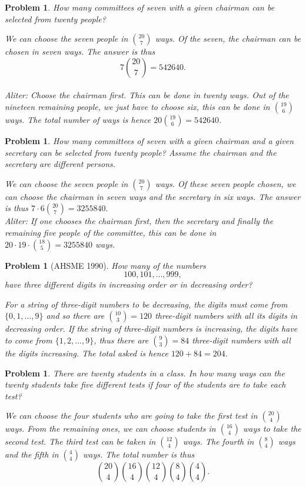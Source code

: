 \documentclass[11pt, openany]{book}
\theoremstyle{change} \theoremheaderfont{\blue\sffamily\bfseries}
\newtheorem{pro}[thm]{Problem}
\theoremstyle{nonumberplain} \theoremheaderfont{\sffamily\bfseries}
\def\binom#1#2{{#1\choose#2}}
\newcommand{\í}{\'{\i}}
\begin{document}
\begin{multicols}{2}
\begin{pro} How many committees of seven with a given chairman can be
selected from twenty people? \begin{answer} We can choose the seven
people in $\binom{20}{7}$ ways. Of the seven, the chairman
can be chosen in seven ways. The answer is thus $$7\binom{20}{7} = 542640.$$ \\
{\em Aliter}: Choose the chairman first. This can be done in twenty
ways. Out of the nineteen remaining people, we just have to choose
six, this can be done in $\binom{19}{6}$ ways. The total number of
ways is hence $20\binom{19}{6} = 542640$.
\end{answer}
\end{pro}
\begin{pro} How many committees of seven with a given chairman and a given
secretary can be selected from twenty people? Assume the chairman
and the secretary are different persons. \begin{answer} We can
choose the seven people in $\binom{20}{7}$ ways. Of these seven
people chosen, we can choose the chairman in seven ways and the
secretary in six ways. The
answer is thus $7\cdot 6\binom{20}{7} = 3255840.$ \\
{\em Aliter}: If one chooses the chairman first, then the secretary
and finally the remaining five people of the committee, this can be
done in $20\cdot 19\cdot \binom{18}{5} = 3255840$ ways.
\end{answer}
\end{pro}
\begin{pro}[AHSME 1990] How many of the numbers $$100, 101, \ldots ,
999, $$ have three different digits in increasing order or in
decreasing order? \begin{answer} For a string of three-digit numbers
to be decreasing, the digits must come from $\{ 0, 1, \ldots , 9\}$
and so there are $\binom{10}{3} = 120$ three-digit numbers with all
its digits in decreasing order.  If the string of three-digit
numbers is increasing, the digits have to come from $\{ 1, 2, \ldots
, 9\}$, thus there are $\binom{9}{3} = 84$ three-digit numbers with
all the digits increasing. The total asked is hence $120 + 84 =
204.$
\end{answer}
\end{pro}
\begin{pro} There are twenty students in a class. In how many ways can
the twenty students take five different tests if four of the
students are to take each test? \begin{answer} We can choose the
four students who are going to take the first test in
$\binom{20}{4}$ ways. From the remaining ones, we can choose
students in $\binom{16}{4}$ ways to take the second test. The third
test can be taken in $\binom{12}{4}$ ways. The fourth in
$\binom{8}{4}$ ways and the fifth in $\binom{4}{4}$ ways. The total
number is thus
$$ \binom{20}{4}\binom{16}{4}\binom{12}{4}\binom{8}{4}\binom{4}{4}.$$
\end{answer}
\end{pro}


\end{multicols}
\end{document}
